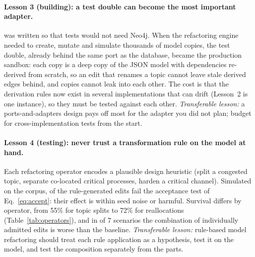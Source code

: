 \paragraph{Lesson 3 (building): a test double can become the most important adapter.}  was written so that tests would not need Neo4j. When the refactoring engine needed to create, mutate and simulate thousands of model copies, the test double, already behind the same port as the database, became the production sandbox: each copy is a deep copy of the JSON model with dependencies re-derived from scratch, so an edit that renames a topic cannot leave stale derived edges behind, and copies cannot leak into each other. The cost is that the derivation rules now exist in several implementations that can drift (Lesson~2 is one instance), so they must be tested against each other. \emph{Transferable lesson:} a ports-and-adapters design pays off most for the adapter you did not plan; budget for cross-implementation tests from the start.

\paragraph{Lesson 4 (testing): never trust a transformation rule on the model at hand.} Each refactoring operator encodes a plausible design heuristic (split a congested topic, separate co-located critical processes, harden a critical channel). Simulated on the corpus, \PrescribeRejectedPct{} of the \PrescribeCandidates{} rule-generated edits fail the acceptance test of Eq.~\eqref{eq:accept}: their effect is within seed noise or harmful. Survival differs by operator, from 55\% for topic splits to 72\% for reallocations (Table~\ref{tab:operators}), and in \PrescribeRegressedScenarios{} of 7 scenarios the combination of individually admitted edits is worse than the baseline. \emph{Transferable lesson:} rule-based model refactoring should treat each rule application as a hypothesis, test it on the model, and test the composition separately from the parts.

